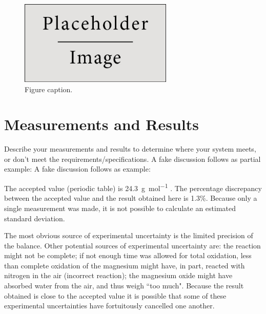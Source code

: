 \documentclass[11pt,a4paper]{article}
\begin{document}
\begin{figure}[ht]
	\begin{center}
		\includegraphics[width=0.65\textwidth]{placeholder} %
		\caption{Figure caption.}
		\label{fig:place}
	\end{center}
\end{figure}

\section{Measurements and Results}

Describe your measurements and results to determine where your system meets, or don't meet the requirements/specifications. A fake discussion follows as partial example: A fake discussion follows as example:

The accepted value (periodic table) is \SI{24.3}{\gram\per\mole} \cite{Smith:2012qr}. The percentage discrepancy between the accepted value and the result obtained here is 1.3\%. Because only a single measurement was made, it is not possible to calculate an estimated standard deviation.

The most obvious source of experimental uncertainty is the limited precision of the balance. Other potential sources of experimental uncertainty are: the reaction might not be complete; if not enough time was allowed for total oxidation, less than complete oxidation of the magnesium might have, in part, reacted with nitrogen in the air (incorrect reaction); the magnesium oxide might have absorbed water from the air, and thus weigh ``too much". Because the result obtained is close to the accepted value it is possible that some of these experimental uncertainties have fortuitously cancelled one another.

\end{document}
